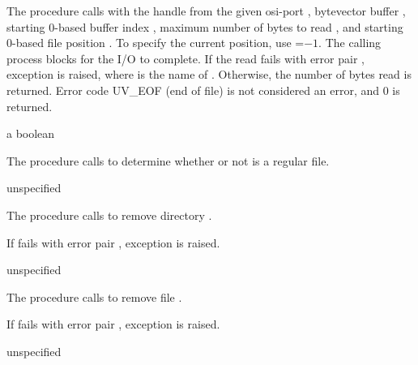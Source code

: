 The  procedure calls  with
the handle from the given osi-port , bytevector buffer
, starting 0-based buffer index , maximum number of
bytes to read , and starting 0-based file position . To
specify the current position, use =$-1$. The calling process
blocks for the I/O to complete. If the read fails with error pair
, exception  is raised, where  is
the name of . Otherwise, the number of bytes read is
returned. Error code UV\_EOF (end of file) is not considered an error,
and 0 is returned.

\begin{procedure}
\end{procedure}
\returns{} a boolean

The  procedure calls 
to determine whether or not  is a regular file.

\begin{procedure}
\end{procedure}
\returns{} unspecified

The  procedure calls
 to remove directory .

If  fails with error pair
, exception  is raised.

\begin{procedure}
\end{procedure}
\returns{} unspecified

The  procedure calls  to remove
file .

If  fails with error pair , exception  is raised.

\begin{procedure}
\end{procedure}
\returns{} unspecified

